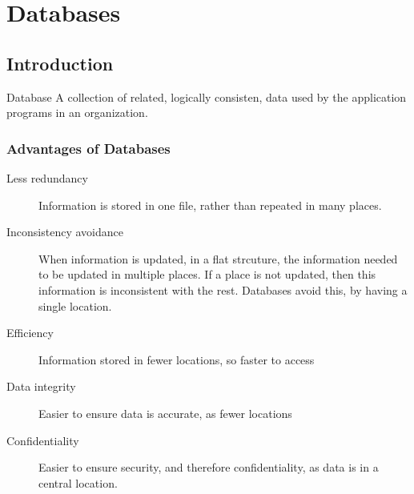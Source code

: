 \documentclass[\main/notes.tex]{subfiles}
\begin{document}
	\setcounter{chapter}{13}
	\chapter{Databases}
		\section{Introduction}
			\begin{definition}{Database}
				A collection of related, logically consisten, data used by the application programs in an organization.
			\end{definition}
			\subsection{Advantages of Databases}
				\begin{indentparagraph}
					\begin{description}
						\item[Less redundancy] Information is stored in one file, rather than repeated in many places.
						\item[Inconsistency avoidance] When information is updated, in a flat strcuture, the information needed to be updated in multiple places. If a place is not updated, then this information is inconsistent with the rest. Databases avoid this, by having a single location.
						\item[Efficiency] Information stored in fewer locations, so faster to access
						\item[Data integrity] Easier to ensure data is accurate, as fewer locations
						\item[Confidentiality] Easier to ensure security, and therefore confidentiality, as data is in a central location.
					\end{description}
				\end{indentparagraph}
\end{document}
